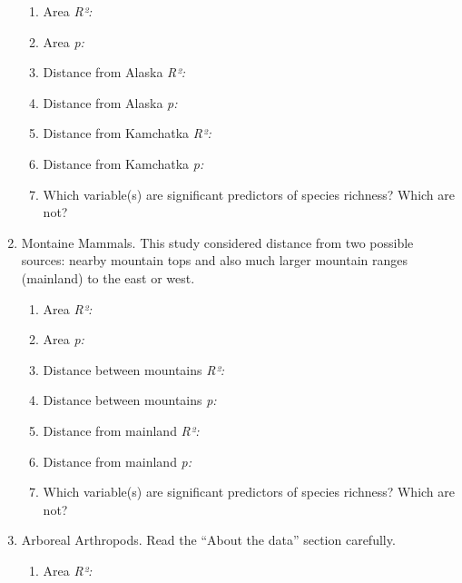\documentclass[11pt, addpoints]{exam}
\begin{document}
\begin{questions}
\begin{enumerate}
	\begin{enumerate}
		\item  Area \textit{R²:} 
	
		\item Area \textit{p:}
	
		\item  Distance from Alaska \textit{R²:} 
	
		\item Distance from Alaska \textit{p:}
	
		\item  Distance from Kamchatka \textit{R²:} 

		\item Distance from Kamchatka \textit{p:}
		
		\item Which variable(s) are significant predictors of species richness? Which are not?
		
	\end{enumerate}

	\item Montaine Mammals. This study considered distance from two possible sources: nearby
	mountain tops and also much larger mountain ranges (mainland) to the east or west.

	\begin{enumerate}
		\item  Area \textit{R²:} 
	
		\item Area \textit{p:}
	
		\item  Distance between mountains \textit{R²:} 
	
		\item Distance between mountains \textit{p:}
	
		\item  Distance from mainland \textit{R²:} 
	
		\item Distance from mainland \textit{p:}
	
		\item Which variable(s) are significant predictors of species richness? Which are not?
	
	\end{enumerate}

	\item Arboreal Arthropods. Read the “About the data” section carefully.

\begin{enumerate}
	\item  Area \textit{R²:} 
	

\end{enumerate}
\end{enumerate}
\end{questions}
\end{document}
